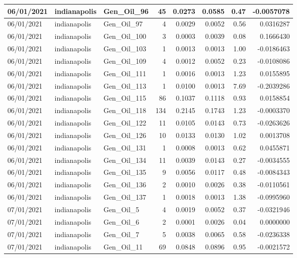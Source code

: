 \documentclass[
  letterpaper,
  DIV=11,
  numbers=noendperiod]{scrartcl}
\begin{document}
\begin{tabular}{l|l|l|r|r|r|r|r}
\hline
06/01/2021 & indianapolis & Gen\_Oil\_96 & 45 & 0.0273 & 0.0585 & 0.47 & -0.0057078\\
\hline
06/01/2021 & indianapolis & Gen\_Oil\_97 & 4 & 0.0029 & 0.0052 & 0.56 & 0.0316287\\
\hline
06/01/2021 & indianapolis & Gen\_Oil\_100 & 3 & 0.0003 & 0.0039 & 0.08 & 0.1666430\\
\hline
06/01/2021 & indianapolis & Gen\_Oil\_103 & 1 & 0.0013 & 0.0013 & 1.00 & -0.0186463\\
\hline
06/01/2021 & indianapolis & Gen\_Oil\_109 & 4 & 0.0012 & 0.0052 & 0.23 & -0.0108086\\
\hline
06/01/2021 & indianapolis & Gen\_Oil\_111 & 1 & 0.0016 & 0.0013 & 1.23 & 0.0155895\\
\hline
06/01/2021 & indianapolis & Gen\_Oil\_113 & 1 & 0.0100 & 0.0013 & 7.69 & -0.2039286\\
\hline
06/01/2021 & indianapolis & Gen\_Oil\_115 & 86 & 0.1037 & 0.1118 & 0.93 & 0.0158854\\
\hline
06/01/2021 & indianapolis & Gen\_Oil\_118 & 134 & 0.2145 & 0.1743 & 1.23 & -0.0003370\\
\hline
06/01/2021 & indianapolis & Gen\_Oil\_122 & 11 & 0.0105 & 0.0143 & 0.73 & -0.0263626\\
\hline
06/01/2021 & indianapolis & Gen\_Oil\_126 & 10 & 0.0133 & 0.0130 & 1.02 & 0.0013708\\
\hline
06/01/2021 & indianapolis & Gen\_Oil\_131 & 1 & 0.0008 & 0.0013 & 0.62 & 0.0455871\\
\hline
06/01/2021 & indianapolis & Gen\_Oil\_134 & 11 & 0.0039 & 0.0143 & 0.27 & -0.0034555\\
\hline
06/01/2021 & indianapolis & Gen\_Oil\_135 & 9 & 0.0056 & 0.0117 & 0.48 & -0.0084343\\
\hline
06/01/2021 & indianapolis & Gen\_Oil\_136 & 2 & 0.0010 & 0.0026 & 0.38 & -0.0110561\\
\hline
06/01/2021 & indianapolis & Gen\_Oil\_137 & 1 & 0.0018 & 0.0013 & 1.38 & -0.0995960\\
\hline
07/01/2021 & indianapolis & Gen\_Oil\_5 & 4 & 0.0019 & 0.0052 & 0.37 & -0.0321946\\
\hline
07/01/2021 & indianapolis & Gen\_Oil\_6 & 2 & 0.0001 & 0.0026 & 0.04 & 0.0000000\\
\hline
07/01/2021 & indianapolis & Gen\_Oil\_7 & 5 & 0.0038 & 0.0065 & 0.58 & -0.0236338\\
\hline
07/01/2021 & indianapolis & Gen\_Oil\_11 & 69 & 0.0848 & 0.0896 & 0.95 & -0.0021572\\

\end{tabular}
\end{document}
